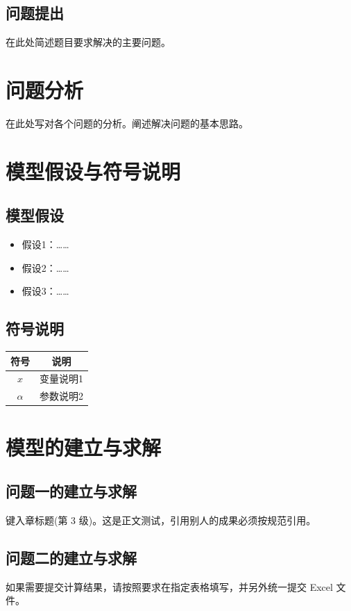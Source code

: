 \documentclass[a4paper,12pt]{ctexart}
\begin{document}
\subsection{问题提出}
在此处简述题目要求解决的主要问题。

\section{问题分析}
在此处写对各个问题的分析。阐述解决问题的基本思路。

\section{模型假设与符号说明}
\subsection{模型假设}
\begin{itemize}
    \item 假设1：……
    \item 假设2：……
    \item 假设3：……
\end{itemize}

\subsection{符号说明}
\begin{table}[H]
    \centering
    \begin{tabular}{cc}
        \toprule
        \textbf{符号} & \textbf{说明} \\
        \midrule
        $x$ & 变量说明1 \\
        $\alpha$ & 参数说明2 \\
        \bottomrule
    \end{tabular}
\end{table}

\section{模型的建立与求解}
\subsection{问题一的建立与求解}
键入章标题(第 3 级)。这是正文测试，引用别人的成果必须按规范引用\cite{ref1}。

\subsection{问题二的建立与求解}
如果需要提交计算结果，请按照要求在指定表格填写，并另外统一提交 Excel 文件。
\end{document}
